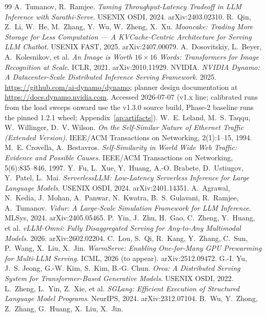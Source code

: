 \begin{thebibliography}{99}
A.~Tumanov, R.~Ramjee.
\emph{Taming Throughput-Latency Tradeoff in LLM Inference with
Sarathi-Serve}.
USENIX OSDI, 2024. arXiv:2403.02310.
R.~Qin, Z.~Li, W.~He, M.~Zhang, Y.~Wu, W.~Zheng, X.~Xu.
\emph{Mooncake: Trading More Storage for Less Computation --- A
KVCache-Centric Architecture for Serving LLM Chatbot}.
USENIX FAST, 2025. arXiv:2407.00079.
A.~Dosovitskiy, L.~Beyer, A.~Kolesnikov, et al.
\emph{An Image is Worth $16\times16$ Words: Transformers for Image
Recognition at Scale}.
ICLR, 2021. arXiv:2010.11929.
NVIDIA.
\emph{NVIDIA Dynamo: A Datacenter-Scale Distributed Inference Serving
Framework}. 2025.
\url{https://github.com/ai-dynamo/dynamo}; planner design documentation
at \url{https://docs.dynamo.nvidia.com}. Accessed 2026-07-07 (v1.x
line; calibrated runs from the load sweeps onward use the v1.3.0 source
build, Phase-2 baseline runs the pinned 1.2.1 wheel;
Appendix~\ref{ap:artifacts}).
W.~E. Leland, M.~S. Taqqu, W.~Willinger, D.~V. Wilson.
\emph{On the Self-Similar Nature of Ethernet Traffic (Extended Version)}.
IEEE/ACM Transactions on Networking, 2(1):1--15, 1994.
M.~E. Crovella, A.~Bestavros.
\emph{Self-Similarity in World Wide Web Traffic: Evidence and Possible
Causes}.
IEEE/ACM Transactions on Networking, 5(6):835--846, 1997.
Y.~Fu, L.~Xue, Y.~Huang, A.-O. Brabete, D.~Ustiugov, Y.~Patel, L.~Mai.
\emph{ServerlessLLM: Low-Latency Serverless Inference for Large Language
Models}.
USENIX OSDI, 2024. arXiv:2401.14351.
A.~Agrawal, N.~Kedia, J.~Mohan, A.~Panwar, N.~Kwatra, B.~S. Gulavani,
R.~Ramjee, A.~Tumanov.
\emph{Vidur: A Large-Scale Simulation Framework for LLM Inference}.
MLSys, 2024. arXiv:2405.05465.
P.~Yin, J.~Zhu, H.~Gao, C.~Zheng, Y.~Huang, et al.
\emph{vLLM-Omni: Fully Disaggregated Serving for Any-to-Any Multimodal
Models}. 2026. arXiv:2602.02204.
C.~Lou, S.~Qi, R.~Kang, Y.~Zhang, C.~Sun, P.~Wang, X.~Liu, X.~Jin.
\emph{WarmServe: Enabling One-for-Many GPU Prewarming for Multi-LLM
Serving}. ICML, 2026 (to appear). arXiv:2512.09472.
G.-I. Yu, J.~S. Jeong, G.-W. Kim, S.~Kim, B.-G. Chun.
\emph{Orca: A Distributed Serving System for Transformer-Based Generative
Models}.
USENIX OSDI, 2022.
L.~Zheng, L.~Yin, Z.~Xie, et al.
\emph{SGLang: Efficient Execution of Structured Language Model Programs}.
NeurIPS, 2024. arXiv:2312.07104.
B.~Wu, Y.~Zhong, Z.~Zhang, G.~Huang, X.~Liu, X.~Jin.

\end{thebibliography}

